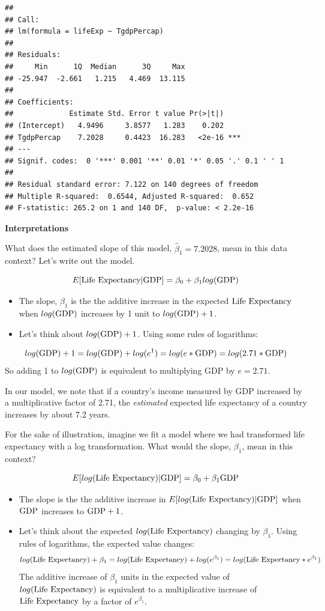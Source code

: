 \documentclass[
]{book}
\begin{document}
\begin{verbatim}
## 
## Call:
## lm(formula = lifeExp ~ TgdpPercap)
## 
## Residuals:
##     Min      1Q  Median      3Q     Max 
## -25.947  -2.661   1.215   4.469  13.115 
## 
## Coefficients:
##             Estimate Std. Error t value Pr(>|t|)    
## (Intercept)   4.9496     3.8577   1.283    0.202    
## TgdpPercap    7.2028     0.4423  16.283   <2e-16 ***
## ---
## Signif. codes:  0 '***' 0.001 '**' 0.01 '*' 0.05 '.' 0.1 ' ' 1
## 
## Residual standard error: 7.122 on 140 degrees of freedom
## Multiple R-squared:  0.6544,	Adjusted R-squared:  0.652 
## F-statistic: 265.2 on 1 and 140 DF,  p-value: < 2.2e-16
\end{verbatim}

\textbf{Interpretations}

What does the estimated slope of this model, \(\hat{\beta}_1 = 7.2028\), mean in this data context? Let's write out the model.

\[E[\hbox{Life Expectancy} | \hbox{GDP} ] = \beta_0 + \beta_1 log(\hbox{GDP})\]

\begin{itemize}
\item
  The slope, \(\beta_1\) is the the additive increase in the expected \(\hbox{Life Expectancy}\) when \(log(\hbox{GDP})\) increases by 1 unit to \(log(\hbox{GDP}) + 1\).
\item
  Let's think about \(log(\hbox{GDP}) + 1\). Using some rules of logarithms:
\end{itemize}

\[log(\hbox{GDP}) + 1 = log(\hbox{GDP}) + log(e^1) = log(e*\hbox{GDP}) = log(2.71*\hbox{GDP})\]
So adding 1 to \(log(\hbox{GDP})\) is equivalent to multiplying GDP by \(e=2.71\).

In our model, we note that if a country's income measured by GDP increased by a multiplicative factor of 2.71, the \emph{estimated} expected life expectancy of a country increases by about 7.2 years.

For the sake of illustration, imagine we fit a model where we had transformed life expectancy with a log transformation. What would the slope, \(\beta_1\), mean in this context?

\[E[log(\hbox{Life Expectancy}) | \hbox{GDP} ] = \beta_0 + \beta_1 \hbox{GDP}\]

\begin{itemize}
\item
  The slope is the the additive increase in \(E[log(\hbox{Life Expectancy}) | \hbox{GDP} ]\) when \(\hbox{GDP}\) increases to \(\hbox{GDP} + 1\).
\item
  Let's think about the expected \(log(\hbox{Life Expectancy})\) changing by \(\beta_1\). Using rules of logarithms, the expected value changes:
  \[log(\hbox{Life Expectancy}) + \beta_1 = log(\hbox{Life Expectancy}) + log(e^{\beta_1}) = log(\hbox{Life Expectancy} * e^{\beta_1}) \]
  The additive increase of \(\beta_1\) units in the expected value of \(log(\hbox{Life Expectancy})\) is equivalent to a multiplicative increase of \(\hbox{Life Expectancy}\) by a factor of \(e^{\beta_1}\).
\end{itemize}
\end{document}

